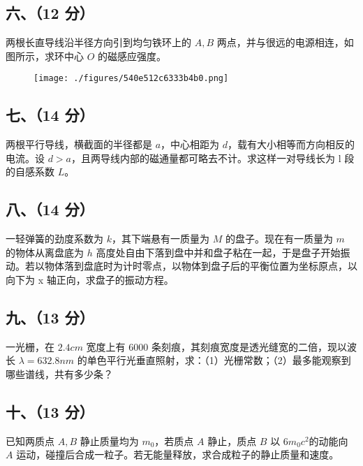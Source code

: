 \subsection{六、（12 分）}
两根长直导线沿半径方向引到均匀铁环上的 $A,B$ 两点，并与很远的电源相连，如图所示，求环中心 $O$ 的磁感应强度。
\begin{figure}[ht]
\centering
\texttt{[image: ./figures/540e512c6333b4b0.png]}
\caption{} \label{fig_NJUD3_6}
\end{figure}
\subsection{七、（14 分）}
两根平行导线，横截面的半径都是 $a$，中心相距为 $d$，载有大小相等而方向相反的电流。设 $d>a$，且两导线内部的磁通量都可略去不计。求这样一对导线长为 l 段的自感系数 $L$。
\subsection{八、（14 分）}
一轻弹簧的劲度系数为 $k$，其下端悬有一质量为 $M$ 的盘子。现在有一质量为 $m$ 的物体从离盘底为 $h$ 高度处自由下落到盘中并和盘子粘在一起，于是盘子开始振动。若以物体落到盘底时为计时零点，以物体到盘子后的平衡位置为坐标原点，以向下为 x 轴正向，求盘子的振动方程。
\subsection{九、（13 分）}
一光栅，在 $2.4cm$ 宽度上有 6000 条刻痕，其刻痕宽度是透光缝宽的二倍，现以波长 $\lambda=632.8nm$ 的单色平行光垂直照射，求：（1）光栅常数；（2）最多能观察到哪些谱线，共有多少条？
\subsection{十、（13 分）}
已知两质点 $A,B$ 静止质量均为 $m_0$，若质点 $A$ 静止，质点 $B$ 以 $6m_0c^2$的动能向 $A$ 运动，碰撞后合成一粒子。若无能量释放，求合成粒子的静止质量和速度。